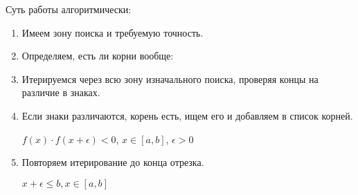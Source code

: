 Суть работы алгоритмически:
\begin{enumerate}
    \item Имеем зону поиска и требуемую точность.
    \item Определяем, есть ли корни вообще:
    \item Итерируемся через всю зону изначального поиска, проверяя концы на различие в знаках.
    \item Если знаки различаются, корень есть, ищем его и добавляем в список корней. \begin{center}
        $f(x) \cdot f(x + \epsilon) < 0$, $x \in [a,b]$, $\epsilon > 0$
    \end{center}
    \item Повторяем итерирование до конца отрезка. \begin{center}
        $x + \epsilon \leq b, x \in [a,b]$
    \end{center}
\end{enumerate}